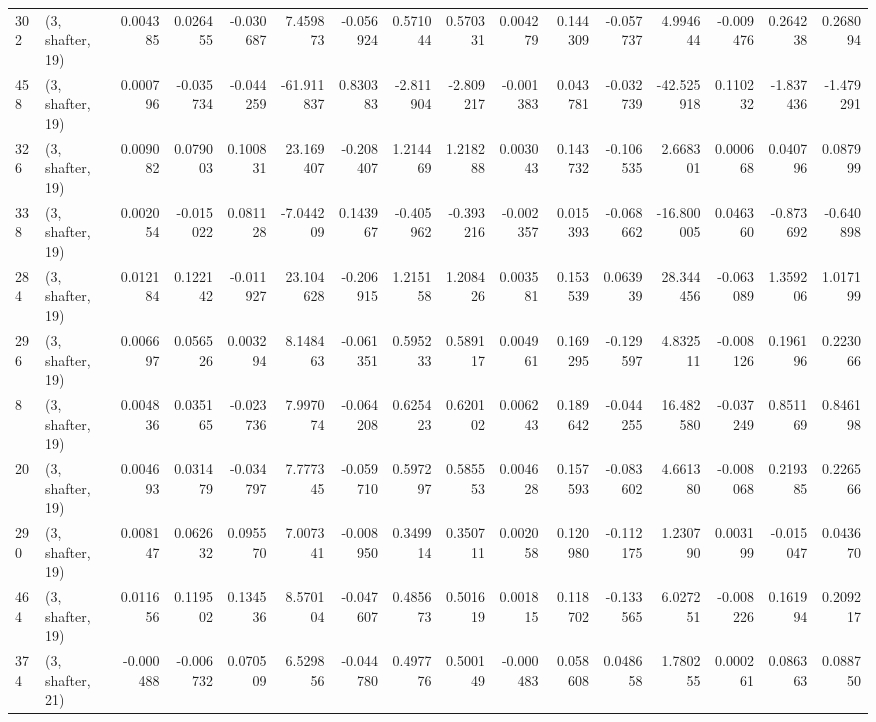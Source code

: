\begin{tabular}{llrrrrrrrrrrrrrr}
302 &  (3, shafter, 19) &   0.004385 &  0.026455 & -0.030687 &    7.459873 & -0.056924 &   0.571044 &  0.570331 &  0.004279 &  0.144309 & -0.057737 &    4.994644 & -0.009476 &  0.264238 &  0.268094 \\
458 &  (3, shafter, 19) &   0.000796 & -0.035734 & -0.044259 &  -61.911837 &  0.830383 &  -2.811904 & -2.809217 & -0.001383 &  0.043781 & -0.032739 &  -42.525918 &  0.110232 & -1.837436 & -1.479291 \\
326 &  (3, shafter, 19) &   0.009082 &  0.079003 &  0.100831 &   23.169407 & -0.208407 &   1.214469 &  1.218288 &  0.003043 &  0.143732 & -0.106535 &    2.668301 &  0.000668 &  0.040796 &  0.087999 \\
338 &  (3, shafter, 19) &   0.002054 & -0.015022 &  0.081128 &   -7.044209 &  0.143967 &  -0.405962 & -0.393216 & -0.002357 &  0.015393 & -0.068662 &  -16.800005 &  0.046360 & -0.873692 & -0.640898 \\
284 &  (3, shafter, 19) &   0.012184 &  0.122142 & -0.011927 &   23.104628 & -0.206915 &   1.215158 &  1.208426 &  0.003581 &  0.153539 &  0.063939 &   28.344456 & -0.063089 &  1.359206 &  1.017199 \\
296 &  (3, shafter, 19) &   0.006697 &  0.056526 &  0.003294 &    8.148463 & -0.061351 &   0.595233 &  0.589117 &  0.004961 &  0.169295 & -0.129597 &    4.832511 & -0.008126 &  0.196196 &  0.223066 \\
8   &  (3, shafter, 19) &   0.004836 &  0.035165 & -0.023736 &    7.997074 & -0.064208 &   0.625423 &  0.620102 &  0.006243 &  0.189642 & -0.044255 &   16.482580 & -0.037249 &  0.851169 &  0.846198 \\
20  &  (3, shafter, 19) &   0.004693 &  0.031479 & -0.034797 &    7.777345 & -0.059710 &   0.597297 &  0.585553 &  0.004628 &  0.157593 & -0.083602 &    4.661380 & -0.008068 &  0.219385 &  0.226566 \\
290 &  (3, shafter, 19) &   0.008147 &  0.062632 &  0.095570 &    7.007341 & -0.008950 &   0.349914 &  0.350711 &  0.002058 &  0.120980 & -0.112175 &    1.230790 &  0.003199 & -0.015047 &  0.043670 \\
464 &  (3, shafter, 19) &   0.011656 &  0.119502 &  0.134536 &    8.570104 & -0.047607 &   0.485673 &  0.501619 &  0.001815 &  0.118702 & -0.133565 &    6.027251 & -0.008226 &  0.161994 &  0.209217 \\
374 &  (3, shafter, 21) &  -0.000488 & -0.006732 &  0.070509 &    6.529856 & -0.044780 &   0.497776 &  0.500149 & -0.000483 &  0.058608 &  0.048658 &    1.780255 &  0.000261 &  0.086363 &  0.088750 \\

\end{tabular}

